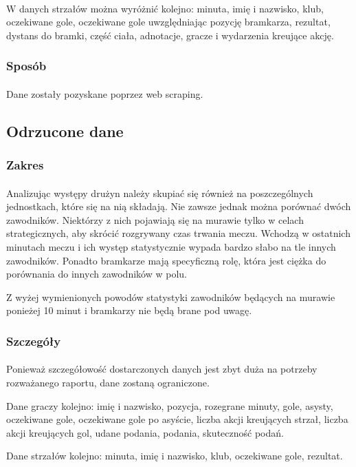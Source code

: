 \documentclass[12pt, letterpaper]{article}
\begin{document}
\paragraph{} W danych strzałów można wyróżnić kolejno: minuta, imię i nazwisko, klub, oczekiwane gole, oczekiwane gole uwzględniając pozycję bramkarza, rezultat, dystans do bramki, część ciała, adnotacje, gracze i wydarzenia kreujące akcję.
\subsubsection{Sposób}
\paragraph{} Dane zostały pozyskane poprzez web scraping\cite{link}.
\subsection{Odrzucone dane}
\subsubsection{Zakres}
\paragraph{} Analizując występy drużyn należy skupiać się również na poszczególnych jednostkach, które się na nią składają. Nie zawsze jednak można porównać dwóch zawodników. Niektórzy z nich pojawiają się na murawie tylko w celach strategicznych, aby skrócić rozgrywany czas trwania meczu. Wchodzą w ostatnich minutach meczu i ich występ statystycznie wypada bardzo słabo na tle innych zawodników. Ponadto bramkarze mają specyficzną rolę, która jest ciężka do porównania do innych zawodników w polu. \par Z wyżej wymienionych powodów statystyki zawodników będących na murawie ponieżej 10 minut i bramkarzy nie będą brane pod uwagę.
\subsubsection{Szczegóły}
\paragraph{} Ponieważ szczegółowość dostarczonych danych jest zbyt duża na potrzeby rozważanego raportu, dane zostaną ograniczone. \par Dane graczy kolejno: imię i nazwisko, pozycja, rozegrane minuty, gole, asysty, oczekiwane gole, oczekiwane gole po asyście, liczba akcji kreujących strzał, liczba akcji kreujących gol, udane podania, podania, skuteczność podań. \par Dane strzałów kolejno: minuta, imię i nazwisko, klub, oczekiwane gole, rezultat.
\end{document}
